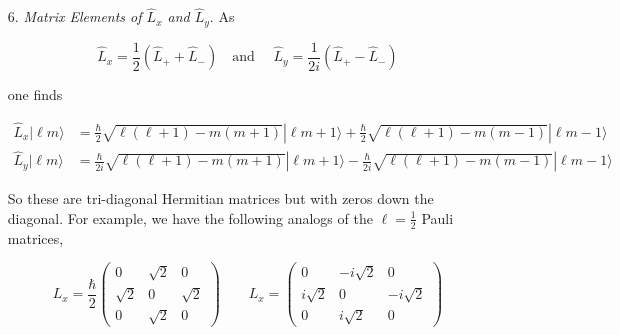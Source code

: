 \begin{itemize}
    and so on. We adopt such a phase convention for fixing relative phases,
    leaving one overall phase still arbitrary, yielding the conventional
    fixed angular momentum operators

    \begin{mainbox}{Angular Momentum Operators}
      \begin{align} \label{}
        \hat{L}_+ |n\ell m \rangle &= \hbar \sqrt{\ell(\ell + 1) - m ( m +1)}
        | n\ell m + 1 \rangle \\ \hat{L}_-|n \ell m \rangle &= \hbar
        \sqrt{\ell(\ell+1) - m(m-1)} |n \ell m -1 \rangle
      \end{align}
    \end{mainbox}
    
    This choice is incorporated in definitions of the $Y_{\ell m}$s for
    example. Now with these definitions we see 

    \[
    \hat{L}_+|n \ell \ell \rangle = 0 \qquad \hat{L}_-|n \ell - \ell \rangle
    = 0
    \] \vspace{3px}
    
    like I mentioned above. 
    
  \item[6.] \textit{Matrix Elements of $\hat{L}_x$ and $\hat{L}_y$}. As 

    \[
    \hat{L}_x = \frac{1}{2} \left( \hat{L}_+ + \hat{L}_- \right) \quad \text{
    and }  \quad  \hat{L}_y = \frac{1}{2i} \left( \hat{L}_+ - \hat{L}_- \right)   
    \] \vspace{3px}

    one finds 

    \begin{align} \label{}
      \hat{L}_x|\ell m \rangle &= \frac{\hbar}{2} \sqrt{\ell(\ell+1) - m(m+1)}|\ell m +1
      \rangle + \frac{\hbar}{2} \sqrt{\ell(\ell+1) - m(m - 1)}|\ell m -1
      \rangle \\ \hat{L}_y |\ell m \rangle &= \frac{\hbar}{2i}
      \sqrt{\ell(\ell+1) - m(m+1)}|\ell m +1\rangle - \frac{\hbar}{2i}
      \sqrt{\ell(\ell+1) - m (m - 1)}|\ell m -1 \rangle 
    \end{align}\vspace{3px}
    
    
    So these are tri-diagonal Hermitian matrices but with zeros down the
    diagonal. For example, we have the following analogs of the $\ell
    = \frac{1}{2}$ Pauli matrices, 

    \[
    L_x = \frac{\hbar}{2} \begin{pmatrix}
      0 & \sqrt{2} & 0 \\ \sqrt{2} & 0 & \sqrt{2} \\ 0 & \sqrt{2} & 0 
    \end{pmatrix} \qquad L_x = \begin{pmatrix}
      0 & -i\sqrt{2} & 0 \\ i\sqrt{2} & 0 & -i\sqrt{2} \\ 0 & i\sqrt{2} & 0
    \end{pmatrix} 
    \] \vspace{3px}
    

\end{itemize}
